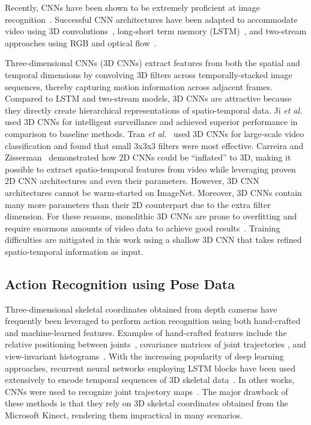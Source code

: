 \documentclass[10pt, conference, compsocconf]{IEEEtran}
\begin{document}
Recently, CNNs have been shown to be extremely proficient at image recognition~\cite{krizhevsky2012imagenet}. Successful CNN architectures have been adapted to accommodate video using 3D convolutions~\cite{ji20133d}, long-short term memory (LSTM)~\cite{donahue2015long}, and two-stream approaches using RGB and optical flow~\cite{karpathy2014large}. 

Three-dimensional CNNs (3D CNNs) extract features from both the spatial and temporal dimensions by convolving 3D filters across temporally-stacked image sequences, thereby capturing motion information across adjacent frames. Compared to LSTM and two-stream models, 3D CNNs are attractive because they directly create hierarchical representations of spatio-temporal data. Ji \textit{et al.}~\cite{ji20133d} used 3D CNNs for intelligent surveillance and achieved superior performance in comparison to baseline methods. Tran \textit{et al.}~\cite{tran2015learning} used 3D CNNs for large-scale video classification and found that small 3x3x3 filters were most effective. Carreira and Zisserman~\cite{carreira2017quo} demonstrated how 2D CNNs could be ``inflated'' to 3D, making it possible to extract spatio-temporal features from video while leveraging proven 2D CNN architectures and even their parameters. However, 3D CNN architectures cannot be warm-started on ImageNet. Moreover, 3D CNNs contain many more parameters than their 2D counterpart due to the extra filter dimension. For these reasons, monolithic 3D CNNs are prone to overfitting and require enormous amounts of video data to achieve good results~\cite{carreira2017quo}. Training difficulties are mitigated in this work using a shallow 3D CNN that takes refined spatio-temporal information as input.

\subsection{Action Recognition using Pose Data} 

Three-dimensional skeletal coordinates obtained from depth cameras have frequently been leveraged to perform action recognition using both hand-crafted and machine-learned features. Examples of hand-crafted features include the relative positioning between joints~\cite{wang2012mining}, covariance matrices of joint trajectories \cite{hussein2013human}, and view-invariant histograms~\cite{xia2012view}. With the increasing popularity of deep learning approaches, recurrent neural networks employing LSTM blocks have been used extensively to encode temporal sequences of 3D skeletal data~\cite{du2015hierarchical, liu2016spatio}. In other works, CNNs were used to recognize joint trajectory maps~\cite{wang2016action, hou2018skeleton}. The major drawback of these methods is that they rely on 3D skeletal coordinates obtained from the Microsoft Kinect, rendering them impractical in many scenarios. 
\end{document}
